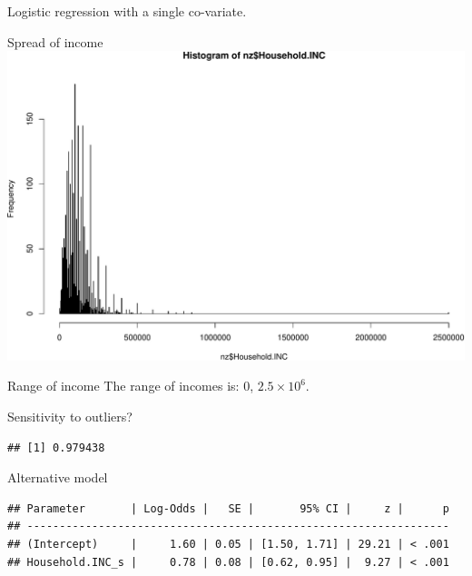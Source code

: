 \documentclass[
  ignorenonframetext,
]{beamer}
\begin{document}
\begin{frame}[fragile]{Logistic regression with a single co-variate.}
\begin{block}{Spread of income}
\protect\hypertarget{spread-of-income}{}
\includegraphics{slides_files/figure-beamer/unnamed-chunk-13-1.pdf}
\end{block}

\begin{block}{Range of income}
\protect\hypertarget{range-of-income}{}
The range of incomes is: 0, \ensuremath{2.5\times 10^{6}}.
\end{block}

\begin{block}{Sensitivity to outliers?}
\protect\hypertarget{sensitivity-to-outliers}{}
\begin{verbatim}
## [1] 0.979438
\end{verbatim}
\end{block}

\begin{block}{Alternative model}
\protect\hypertarget{alternative-model}{}
\begin{verbatim}
## Parameter       | Log-Odds |   SE |       95% CI |     z |      p
## -----------------------------------------------------------------
## (Intercept)     |     1.60 | 0.05 | [1.50, 1.71] | 29.21 | < .001
## Household.INC_s |     0.78 | 0.08 | [0.62, 0.95] |  9.27 | < .001
\end{verbatim}
\end{block}


\end{frame}
\end{document}
